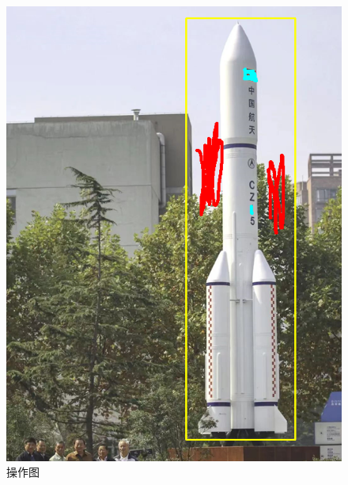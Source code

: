 \documentclass[12pt,a4paper]{article}
\begin{document}
\begin{CJK}{UTF8}{gbsn}
\begin{sloppypar}
\begin{figure}[H]
\begin{minipage}{0.3\linewidth}
		\includegraphics[width=0.9\linewidth]{P2.png}
		\caption{操作图}
		\label{f2}%
	\end{minipage}
	

\end{figure}
\end{sloppypar}
\end{CJK}
\end{document}
